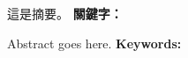 \begin{abstractzh}
    這是摘要。
\bigbreak
\noindent \textbf{關鍵字：}{\, \makeatletter \@keywordszh \makeatother}
\end{abstractzh}

\begin{abstracten}
    Abstract goes here.    
\bigbreak
\noindent \textbf{Keywords:}{\, \makeatletter \@keywordsen \makeatother}
\end{abstracten}

